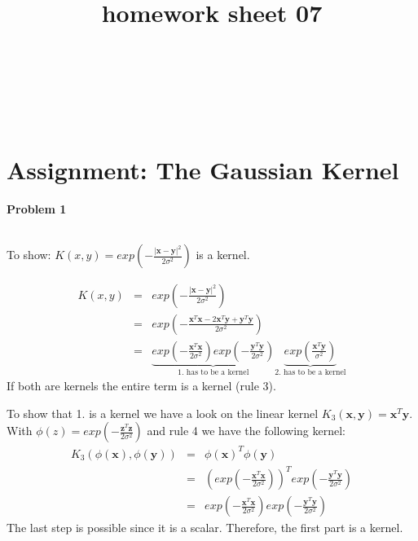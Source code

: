 \documentclass{article}
\title{homework sheet 07}
\author{
\name{Andre Seitz}\\
\imat{03622870}\\
\email{andre.seitz@mytum.de}
\And
\name{Linda Leidig} \\
\imat{03608416}\\
\email{linda.leidig@tum.de}
}
\renewcommand{\Vec}[1]{\ensuremath{\mathbf{#1}}}
\begin{document}
\maketitle

\section{Assignment: The Gaussian Kernel}
\paragraph*{Problem 1}
$\;$ 

To show: $K(x,y) = exp\left(-\frac{|\Vec{x}-\Vec{y}|^2}{2 \sigma^2}\right)$ is a kernel.

\begin{eqnarray}
K(x,y) &=& exp\left(-\frac{|\Vec{x}-\Vec{y}|^2}{2 \sigma^2}\right)\\
&=& exp\left(-\frac{\Vec{x}^T\Vec{x}-2\Vec{x}^T\Vec{y}+\Vec{y}^T\Vec{y}}{2 \sigma^2}\right)\\
&=& \underbrace{exp\left( -\frac{\Vec{x}^T\Vec{x}}{2 \sigma^2}\right) exp\left( -\frac{\Vec{y}^T\Vec{y}}{2 \sigma^2}\right)}_{\text{1. has to be a kernel}} \underbrace{exp\left( \frac{\Vec{x}^T\Vec{y}}{\sigma^2}\right)}_{\text{2. has to be a kernel}} \label{two_terms}
\end{eqnarray}
If both are kernels the entire term is a kernel (rule 3).

To show that 1. is a kernel we have a look on the linear kernel $K_3(\Vec{x}, \Vec{y}) = \Vec{x}^T\Vec{y}$. With $\phi(z) = exp\left( -\frac{\Vec{z}^T\Vec{z}}{2\sigma^2}\right)$ and rule 4 we have the following kernel:
\begin{eqnarray}
K_3(\phi(\Vec{x}), \phi(\Vec{y})) &=& \phi(\Vec{x})^T\phi(\Vec{y})\\
&=& \left(exp\left( -\frac{\Vec{x}^T\Vec{x}}{2\sigma^2}\right)\right)^T exp\left( -\frac{\Vec{y}^T\Vec{y}}{2\sigma^2}\right)\\
&=&exp\left( -\frac{\Vec{x}^T\Vec{x}}{2\sigma^2}\right) exp\left( -\frac{\Vec{y}^T\Vec{y}}{2\sigma^2}\right)
\end{eqnarray}
The last step is possible since it is a scalar. Therefore, the first part is a kernel.
\end{document}
